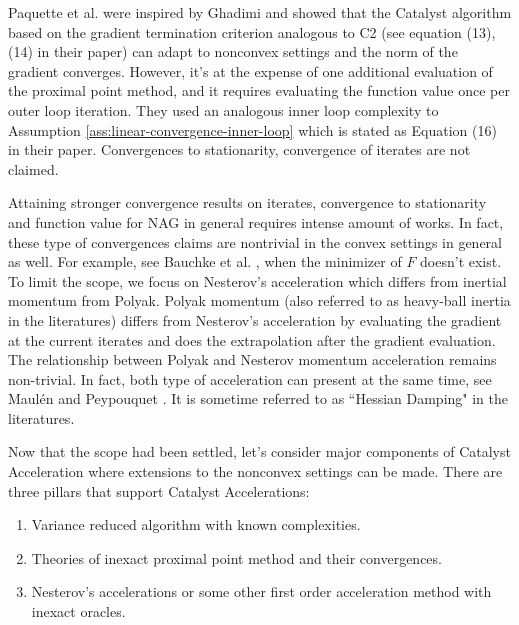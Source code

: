 \documentclass[12pt]{article}
\begin{document}
            Paquette et al. \cite{paquette_catalyst_2018} were inspired by Ghadimi \cite{ghadimi_accelerated_2016} and showed that the Catalyst algorithm based on the gradient termination criterion analogous to C2 (see equation (13), (14) in their paper) can adapt to nonconvex settings and the norm of the gradient converges. 
            However, it's at the expense of one additional evaluation of the proximal point method, and it requires evaluating the function value once per outer loop iteration. 
            They used an analogous inner loop complexity to Assumption \ref{ass:linear-convergence-inner-loop} which is stated as Equation (16) in their paper. 
            Convergences to stationarity, convergence of iterates are not claimed. 
            \par
            Attaining stronger convergence results on iterates, convergence to stationarity and function value for NAG in general requires intense amount of works. 
            In fact, these type of convergences claims are nontrivial in the convex settings in general as well. 
            For example, see Bauchke et al. \cite{bauschke_applying_2020}, when the minimizer of $F$ doesn't exist. 
            To limit the scope, we focus on Nesterov's acceleration which differs from inertial momentum from Polyak.
            Polyak momentum (also referred to as heavy-ball inertia in the literatures) differs from Nesterov's acceleration by evaluating the gradient at the current iterates and does the extrapolation after the gradient evaluation. 
            The relationship between Polyak and Nesterov momentum acceleration remains non-trivial. 
            In fact, both type of acceleration can present at the same time, see Maulén and Peypouquet \cite{maulen_speed_2023}.
            It is sometime referred to as ``Hessian Damping" in the literatures.  
            \par
            Now that the scope had been settled, let's consider major components of Catalyst Acceleration where extensions to the nonconvex settings can be made. 
            There are three pillars that support Catalyst Accelerations: 
            \begin{enumerate}
                \item Variance reduced algorithm with known complexities. 
                \item Theories of inexact proximal point method and their convergences. 
                \item Nesterov's accelerations or some other first order acceleration method with inexact oracles. 
            \end{enumerate}
\end{document}

